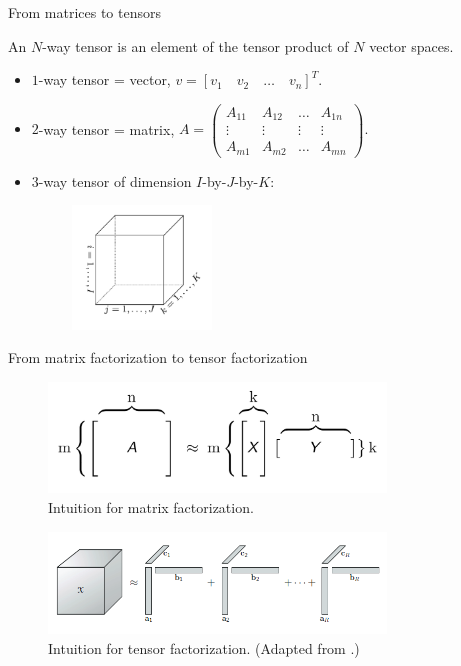 \documentclass[xcolor={dvipsnames,svgnames}]{beamer}
\begin{document}
\begin{frame}{From matrices to tensors}
\begin{defn}[Tensors]
    An $N$-way tensor is an element of the tensor product of $N$ vector spaces. 
    \begin{itemize}
        \item $1$-way tensor = vector, $v = [v_1 \quad v_2 \quad \dots \quad v_n]^T.$
        \vfill
        \item $2$-way tensor = matrix, 
        $A = \left(\begin{matrix}
        A_{1 1} & A_{1 2} & \dots & A_{1 n}\\
        \vdots & \vdots & \vdots & \vdots \\ 
        A_{m 1} & A_{m 2} & \dots & A_{m n}
        \end{matrix}
        \right).$
        \vfill
        \item $3$-way tensor of dimension $I$-by-$J$-by-$K$:
    \begin{figure}[H]
    \centering
    \includegraphics[width=0.35\textwidth]{figures-tensor/tensor-vis.png}
    \end{figure} 
    \end{itemize}
    \end{defn}
\end{frame}

\begin{frame}{From matrix factorization to tensor factorization}
    \begin{figure}[H]
        \centering
            \includegraphics[width=0.8\textwidth]{figures-tensor/matrix_decomp.png}
            \caption{Intuition for matrix factorization.}
        \end{figure} 
    \begin{figure}[H]
        \centering
            \includegraphics[width=0.8\textwidth]{figures-tensor/cp-decomp.png}
            \caption{Intuition for tensor factorization. (Adapted from \cite{Kol2009}.)}
        \end{figure} 
\end{frame}
\end{document}
